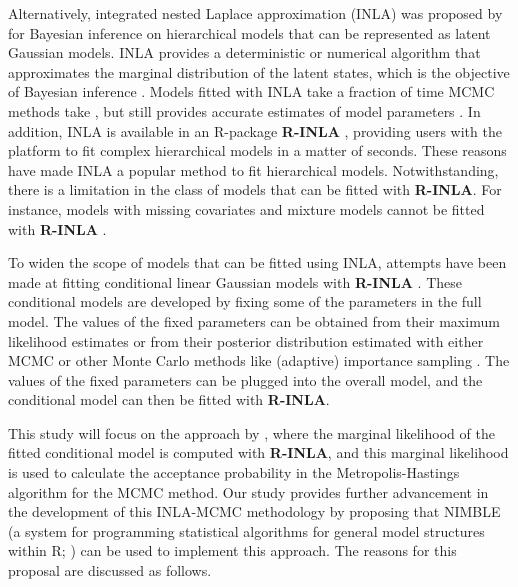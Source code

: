 \documentclass[
]{article}
\begin{document}
Alternatively, integrated nested Laplace approximation (INLA) was
proposed by \citet{rue2009approximate} for Bayesian inference on
hierarchical models that can be represented as latent Gaussian models.
INLA provides a deterministic or numerical algorithm that approximates
the marginal distribution of the latent states, which is the objective
of Bayesian inference \citep{blangiardo2015spatial}. Models fitted with
INLA take a fraction of time MCMC methods take
\citep{blangiardo2015spatial,gomez2018markov}, but still provides
accurate estimates of model parameters
\citep{berild2022importance, gomez2018markov}. In addition, INLA is
available in an R-package \textbf{R-INLA} \citep{rue2009approximate},
providing users with the platform to fit complex hierarchical models in
a matter of seconds. These reasons have made INLA a popular method to
fit hierarchical models. Notwithstanding, there is a limitation in the
class of models that can be fitted with \textbf{R-INLA}. For instance,
models with missing covariates and mixture models cannot be fitted with
\textbf{R-INLA}
\citep{gomez2018markov, berild2022importance, marin2005bayesian}.

To widen the scope of models that can be fitted using INLA, attempts
have been made at fitting conditional linear Gaussian models with
\textbf{R-INLA}
\citep{li2012spatial, bivand2014approximate, gomez2018markov, berild2022importance}.
These conditional models are developed by fixing some of the parameters
in the full model. The values of the fixed parameters can be obtained
from their maximum likelihood estimates \citep{li2012spatial} or from
their posterior distribution estimated with either MCMC
\citep{gomez2018markov, bivand2014approximate} or other Monte Carlo
methods like (adaptive) importance sampling
\citep{berild2022importance}. The values of the fixed parameters can be
plugged into the overall model, and the conditional model can then be
fitted with \textbf{R-INLA}.

This study will focus on the approach by \citet{gomez2018markov}, where
the marginal likelihood of the fitted conditional model is computed with
\textbf{R-INLA}, and this marginal likelihood is used to calculate the
acceptance probability in the Metropolis-Hastings algorithm for the MCMC
method. Our study provides further advancement in the development of
this INLA-MCMC methodology by proposing that NIMBLE (a system for
programming statistical algorithms for general model structures within
R; \citet{nimblearticle}) can be used to implement this approach. The
reasons for this proposal are discussed as follows.
\end{document}
